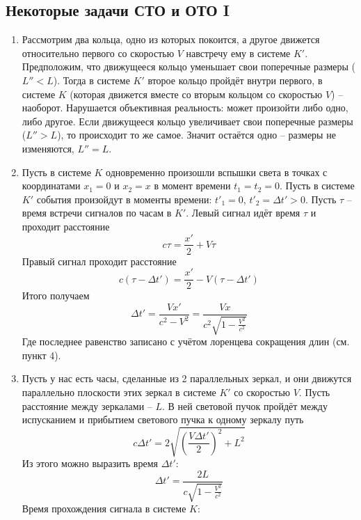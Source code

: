 \documentclass[12pt]{article}
\begin{document}
\subsection{Некоторые задачи СТО и ОТО I}
\begin{enumerate}
\item Рассмотрим два кольца, одно из которых покоится, а другое движется относительно первого со скоростью $V$ навстречу ему в системе $K'$. Предположим, что движущееся кольцо уменьшает свои поперечные размеры ($L''<L$). Тогда в системе $K'$ второе кольцо пройдёт внутри первого, в системе $K$ (которая движется вместе со вторым кольцом со скоростью $V$) -- наоборот. Нарушается объективная реальность: может произойти либо одно, либо другое. Если движущееся кольцо увеличивает свои поперечные размеры ($L''>L$), то происходит то же самое. Значит остаётся одно -- размеры не изменяются, $L''=L$.
\item Пусть в системе $K$ одновременно произошли вспышки света в точках с координатами $x_1=0$ и $x_2=x$ в момент времени $t_1=t_2=0$. Пусть в системе $K'$ события произойдут в моменты времени: $t'_1=0$, $t'_2=\Delta t'>0$. Пусть $\tau$ -- время встречи сигналов по часам в $K'$. Левый сигнал идёт время $\tau$ и проходит расстояние
\begin{equation}
c\tau=\frac{x'}{2}+V\tau
\end{equation}
Правый сигнал проходит расстояние
\begin{equation}
c(\tau-\Delta t')=\frac{x'}{2}-V(\tau-\Delta t')
\end{equation}
Итого получаем
\begin{equation}
\Delta t'=\frac{Vx'}{c^2-V^2}=\frac{Vx}{c^2\sqrt{1-\frac{V^2}{c^2}}}
\end{equation}
Где последнее равенство записано с учётом лоренцева сокращения длин (см. пункт 4).
\item Пусть у нас есть часы, сделанные из 2 параллельных зеркал, и они движутся параллельно плоскости этих зеркал в системе $K'$ со скоростью $V$. Пусть расстояние между зеркалами -- $L$. В ней световой пучок пройдёт между испусканием и прибытием светового пучка к одному зеркалу путь
\begin{equation}
c\Delta t' = 2\sqrt{\left(\frac{V\Delta t'}{2}\right)^2+L^2}
\end{equation}
Из этого можно выразить время $\Delta t'$:
\begin{equation}
\Delta t'=\frac{2L}{c\sqrt{1-\frac{V^2}{c^2}}}
\end{equation}
Время прохождения сигнала в системе $K$:

\end{enumerate}
\end{document}
